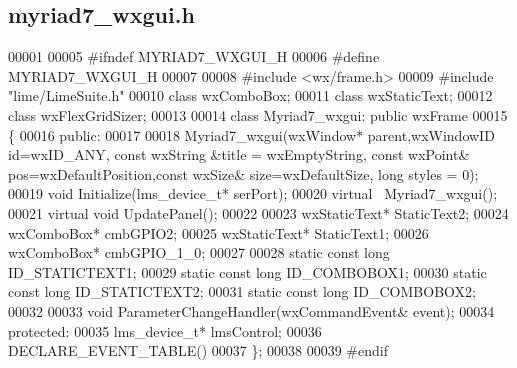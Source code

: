 \subsection{myriad7\+\_\+wxgui.\+h}
\label{myriad7__wxgui_8h_source}

\begin{DoxyCode}
00001 
00005 \textcolor{preprocessor}{#ifndef MYRIAD7\_WXGUI\_H}
00006 \textcolor{preprocessor}{#define MYRIAD7\_WXGUI\_H}
00007 
00008 \textcolor{preprocessor}{#include <wx/frame.h>}
00009 \textcolor{preprocessor}{#include "lime/LimeSuite.h"}
00010 \textcolor{keyword}{class }wxComboBox;
00011 \textcolor{keyword}{class }wxStaticText;
00012 \textcolor{keyword}{class }wxFlexGridSizer;
00013 
00014 \textcolor{keyword}{class }Myriad7_wxgui: \textcolor{keyword}{public} wxFrame
00015 \{
00016     \textcolor{keyword}{public}:
00017 
00018         Myriad7_wxgui(wxWindow* parent,wxWindowID \textcolor{keywordtype}{id}=wxID\_ANY, \textcolor{keyword}{const} wxString &title = wxEmptyString, \textcolor{keyword}{const}
       wxPoint& pos=wxDefaultPosition,\textcolor{keyword}{const} wxSize& size=wxDefaultSize, \textcolor{keywordtype}{long} styles = 0);
00019         \textcolor{keywordtype}{void} Initialize(lms_device_t* serPort);
00020         \textcolor{keyword}{virtual} ~Myriad7_wxgui();
00021         \textcolor{keyword}{virtual} \textcolor{keywordtype}{void} UpdatePanel();
00022 
00023         wxStaticText* StaticText2;
00024         wxComboBox* cmbGPIO2;
00025         wxStaticText* StaticText1;
00026         wxComboBox* cmbGPIO_1_0;
00027 
00028         \textcolor{keyword}{static} \textcolor{keyword}{const} \textcolor{keywordtype}{long} ID_STATICTEXT1;
00029         \textcolor{keyword}{static} \textcolor{keyword}{const} \textcolor{keywordtype}{long} ID_COMBOBOX1;
00030         \textcolor{keyword}{static} \textcolor{keyword}{const} \textcolor{keywordtype}{long} ID_STATICTEXT2;
00031         \textcolor{keyword}{static} \textcolor{keyword}{const} \textcolor{keywordtype}{long} ID_COMBOBOX2;
00032 
00033         \textcolor{keywordtype}{void} ParameterChangeHandler(wxCommandEvent& event);
00034     \textcolor{keyword}{protected}:
00035         lms_device_t* lmsControl;
00036         DECLARE\_EVENT\_TABLE()
00037 \};
00038 
00039 \textcolor{preprocessor}{#endif}
\end{DoxyCode}
